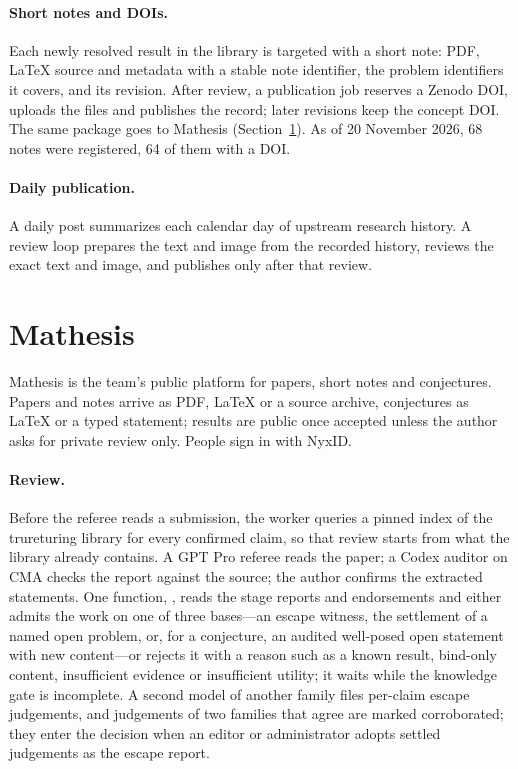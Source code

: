 \documentclass[11pt]{article}
\newcommand{\code}[1]{\texttt{\detokenize{#1}}}
\begin{document}
\paragraph{Short notes and DOIs.} Each newly resolved result in the library
is targeted with a short note: PDF, \LaTeX{} source and metadata with a stable
note identifier, the problem identifiers it covers, and its revision. After
review, a publication job reserves a Zenodo DOI, uploads the files and
publishes the record; later revisions keep the concept DOI. The same package
goes to Mathesis (Section~\ref{sec:mathesis}). As of 20 November 2026, 68
notes were registered, 64 of them with a DOI.

\paragraph{Daily publication.} A daily post summarizes each calendar day of
upstream research history. A review loop prepares the text and image from
the recorded history, reviews the exact text and image, and publishes only
after that review.

\section{Mathesis}
\label{sec:mathesis}
Mathesis \citep{mathesisrepo} is the team's public platform for papers,
short notes and conjectures. Papers and notes arrive as PDF, \LaTeX{} or a
source archive, conjectures as \LaTeX{} or a typed statement; results are
public once accepted unless the author asks for private review only. People
sign in with NyxID.

\paragraph{Review.} Before the referee reads a submission, the worker queries
a pinned index of the trureturing library for every confirmed claim, so that
review starts from what the library already contains. A GPT Pro referee
reads the paper; a Codex auditor on CMA checks the report against the source;
the author confirms the extracted statements. One function,
\code{Policy::decide}, reads the stage reports and endorsements and either
admits the work on one of three bases---an escape witness, the settlement of
a named open problem, or, for a conjecture, an audited well-posed open
statement with new content---or rejects it with a reason such as a known
result, bind-only content, insufficient evidence or insufficient utility; it
waits while the knowledge gate is incomplete. A second model of another
family files per-claim escape judgements, and judgements of two families
that agree are marked corroborated; they enter the decision when an editor
or administrator adopts settled judgements as the escape report.
\end{document}
